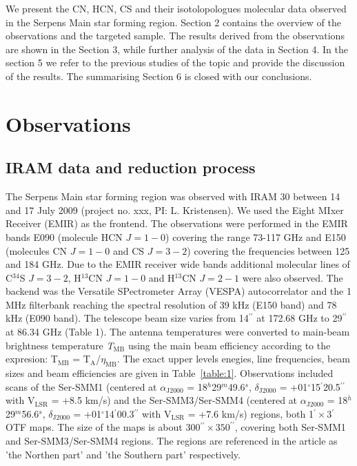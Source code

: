 \documentclass{aa}
\begin{document}
We present the CN, HCN, CS and their isotolopologues molecular data observed in the Serpens Main star forming region. Section 2 contains the overview of the observations and the targeted sample. The results derived from the observations are shown in the Section 3, while further analysis of the data in Section 4. In the section 5 we refer to the previous studies of the topic and provide the discussion of the results. The summarising Section 6 is closed with our conclusions. 

\section{Observations}

\subsection{IRAM data and reduction process}
The Serpens Main star forming region was observed with IRAM 30 between 14 and 17 July 2009 (project no. xxx, PI: L. Kristensen). We used the Eight MIxer Receiver (EMIR) as the frontend. The observations were performed in the EMIR bands E090 (molecule HCN $J=1-0$) covering the range 73-117 GHz and E150 (molecules CN $J=1-0$ and CS $J=3-2$) covering the frequencies between 125 and 184 GHz. Due to the EMIR receiver wide bands additional molecular lines of C$^{34}$S $J=3-2$, H$^{13}$CN $J=1-0$ and H$^{13}$CN $J=2-1$ were also observed. The backend was the Versatile SPectrometer Array (VESPA) autocorrelator and the 1 MHz filterbank reaching the spectral resolution of 39 kHz (E150 band) and 78 kHz (E090 band). The telescope beam size varies from 14$^{\prime\prime}$ at 172.68 GHz to 29$^{\prime\prime}$ at 86.34 GHz (Table 1). The antenna temperatures were converted to main-beam brightness temperature \textit{T$_\mathrm{MB}$} using the main beam efficiency according to the expresion: T$_\mathrm{MB}$ = T$_\mathrm{A}$/$\eta_\mathrm{MB}$. The exact upper levels enegies, line frequencies, beam sizes and beam efficiencies are given in Table~\ref{table:1}. Observations included scans of the Ser-SMM1 (centered at $\alpha_\mathrm{J2000}$ = 18$^h$29$^m$49.6$^s$, $\delta_\mathrm{J2000}$ = +01$^{\circ}$15$^{\prime}$20.5$^{\prime\prime}$ with V$_\mathrm{LSR}$ = +8.5 km/s) and the Ser-SMM3/Ser-SMM4 (centered at $\alpha_\mathrm{J2000}$ = 18$^h$29$^m$56.6$^s$, $\delta_\mathrm{J2000}$ = +01$^{\circ}$14$^{\prime}$00.3$^{\prime\prime}$ with V$_\mathrm{LSR}$ = +7.6 km/s) regions, both 1$^{\prime}\times$3$^{\prime}$ OTF maps. The size of the maps is about 300$^{\prime\prime}\times350^{\prime\prime}$, covering both Ser-SMM1 and Ser-SMM3/Ser-SMM4 regions. The regions are referenced in the article as 'the Northen part' and 'the Southern part' respectively. 
\end{document}
